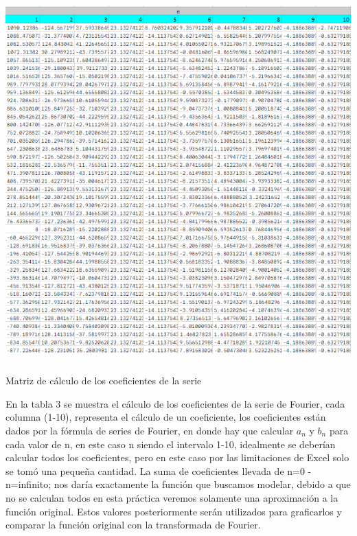\begin{table}[H]
    \centering
    \includegraphics[width=5.5in,height=5.52745in]{media/image21.png}
    \caption{Matriz de cálculo de los coeficientes de la serie}
\end{table}

En la tabla 3 se muestra el cálculo de los coeficientes de la serie de Fourier, cada columna (1-10), representa el cálculo de un coeficiente, los coeficientes están dados por la fórmula de series de Fourier, en donde hay que calcular \(a_n\) y \(b_n\) para cada valor de n, en este caso n siendo el intervalo 1-10, idealmente se deberían calcular todos los coeficientes, pero en este caso por las limitaciones de Excel solo se tomó una pequeña cantidad. La suma de coeficientes llevada de n=0 - n=infinito; nos daría exactamente la función que buscamos modelar, debido a que no se calculan todos en esta práctica veremos solamente una aproximación a la función original. Estos valores posteriormente serán utilizados para graficarlos y comparar la función original con la transformada de Fourier.

